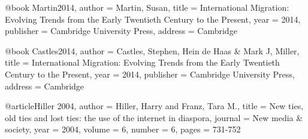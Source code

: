 ﻿@book {Martin2014,
author = {Martin, Susan},
title = {International Migration: Evolving Trends from the Early Twentieth Century to the Present},
year = {2014},
publisher = {Cambridge University Press},
address = {Cambridge}
}

@book {Castles2014,
author = {Castles, Stephen, Hein de Haas & Mark J, Miller},
title = {International Migration: Evolving Trends from the Early Twentieth Century to the Present},
year = {2014},
publisher = {Cambridge University Press},
address = {Cambridge}
}

@article{Hiller 2004,
author = {Hiller, Harry and Franz, Tara M.},
title = {New ties, old ties and lost ties: the use of the internet in diaspora},
journal = {New media & society},
year = {2004},
volume = {6},
number = {6},
pages = {731-752}
}
